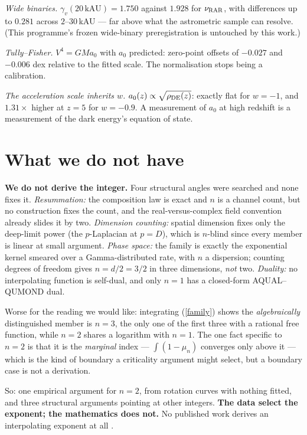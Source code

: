 \documentclass[11pt,letterpaper]{article}
\begin{document}
\emph{Wide binaries.} $\gamma_v(20\,\text{kAU})=1.750$ against $1.928$ for $\nu_{\rm RAR}$, with differences up to $0.281$ across $2$--$30\,$kAU --- far above what the astrometric sample can resolve. (This programme's frozen wide-binary preregistration is untouched by this work.)

\emph{Tully--Fisher.} $V^4=GMa_0$ with $a_0$ predicted: zero-point offsets of $-0.027$ and $-0.006$ dex relative to the fitted scale. The normalisation stops being a calibration.

\emph{The acceleration scale inherits $w$.} $a_0(z)\propto\sqrt{\rho_{\rm DE}(z)}$: exactly flat for $w=-1$, and $1.31\times$ higher at $z=5$ for $w=-0.9$. A measurement of $a_0$ at high redshift is a measurement of the dark energy's equation of state.

\section{What we do not have}
\textbf{We do not derive the integer.} Four structural angles were searched and none fixes it.
\emph{Resummation:} the composition law is exact and $n$ is a channel count, but no construction fixes the count, and the real-versus-complex field convention already slides it by two.
\emph{Dimension counting:} spatial dimension fixes only the deep-limit power (the $p$-Laplacian at $p=D$), which is $n$-blind since every member is linear at small argument.
\emph{Phase space:} the family is exactly the exponential kernel smeared over a Gamma-distributed rate, with $n$ a dispersion; counting degrees of freedom gives $n=d/2=3/2$ in three dimensions, \emph{not} two.
\emph{Duality:} no interpolating function is self-dual, and only $n=1$ has a closed-form AQUAL--QUMOND dual.

Worse for the reading we would like: integrating (\ref{family}) shows the \emph{algebraically} distinguished member is $n=3$, the only one of the first three with a rational free function, while $n=2$ shares a logarithm with $n=1$. The one fact specific to $n=2$ is that it is the \emph{marginal} index --- $\int(1-\mu_n)$ converges only above it --- which is the kind of boundary a criticality argument might select, but a boundary case is not a derivation.

So: one empirical argument for $n=2$, from rotation curves with nothing fitted, and three structural arguments pointing at other integers. \textbf{The data select the exponent; the mathematics does not.} No published work derives an interpolating exponent at all \cite{mondrev25}.
\end{document}
